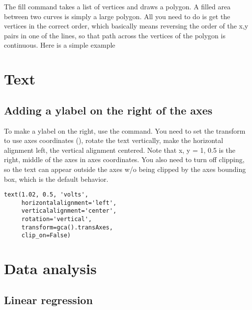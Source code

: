\documentclass[twoside]{book}
\begin{document}
The fill command takes a list of vertices and draws a polygon.  A
filled area between two curves is simply a large polygon.  All you
need to do is get the vertices in the correct order, which basically
means reversing the order of the x,y pairs in one of the lines, so
that path across the vertices of the polygon is continuous.  Here is a
simple example





\section{Text}

\subsection{Adding a ylabel on the right of the axes}
\label{cbook:ylabel_right}


To make a ylabel on the right, use the  command.  You need
to set the transform to use axes coordinates (),
rotate the text vertically, make the horizontal alignment left, the
vertical alignment centered.  Note that x, y = 1, 0.5 is the right,
middle of the axes in axes coordinates.  You also need to turn off
clipping, so the text can appear outside the axes w/o being clipped by
the axes bounding box, which is the default behavior.

\begin{lstlisting}
text(1.02, 0.5, 'volts',
     horizontalalignment='left',
     verticalalignment='center',
     rotation='vertical',
     transform=gca().transAxes,
     clip_on=False)
\end{lstlisting}



\section{Data analysis}

\subsection{Linear regression}
\label{cbook:linear_regression}
\end{document}
